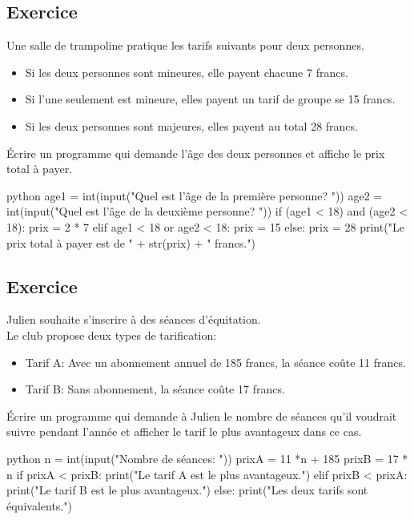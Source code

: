 \documentclass[a4paper,11pt]{article}
\begin{document}
\subsection{Exercice}
Une salle de trampoline pratique les tarifs suivants pour deux personnes.\\
\begin{itemize}
    \item Si les deux personnes sont mineures, elle payent chacune 7 francs.
    \item Si l'une seulement est mineure, elles payent un tarif de groupe se 15 francs.
    \item Si les deux personnes sont majeures, elles payent au total 28 francs.
\end{itemize}
Écrire un programme qui demande l'âge des deux personnes et affiche le prix total à payer.
\begin{solution}
\begin{code}[interactive]{python}
age1 = int(input("Quel est l'âge de la première personne? "))
age2 = int(input("Quel est l'âge de la deuxième personne? "))
if (age1 < 18) and (age2 < 18):
    prix = 2 * 7
elif age1 < 18 or age2 < 18:
    prix = 15
else:
    prix = 28
print("Le prix total à payer est de " + str(prix) + " francs.")
\end{code}
\end{solution}

\subsection{Exercice}
Julien souhaite s'inscrire à des séances d'équitation.\\
Le club propose deux types de tarification:
\begin{itemize}
    \item Tarif A: Avec un abonnement annuel de 185 francs, la séance coûte 11 francs.
    \item Tarif B: Sans abonnement, la séance coûte 17 francs.
\end{itemize}
Écrire un programme qui demande à Julien le nombre de séances qu'il voudrait suivre pendant l'année et afficher le tarif le plus avantageux dans ce cas.
\begin{solution}
\begin{code}[interactive]{python}
n = int(input("Nombre de séances: "))
prixA = 11 *n + 185
prixB = 17 * n
if prixA < prixB:
    print("Le tarif A est le plus avantageux.")
elif prixB < prixA:
    print("Le tarif B est le plus avantageux.")
else:
    print("Les deux tarifs sont équivalents.")
\end{code}
\end{solution}
\end{document}
